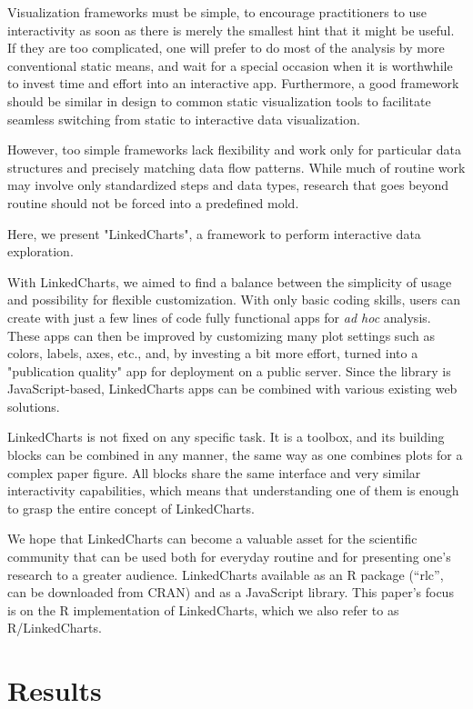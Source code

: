 \documentclass[twocolumn,10pt]{article}
\begin{document}
Visualization frameworks must be simple, to encourage practitioners to use interactivity as soon as there is merely the smallest hint that it might be useful. If they are too complicated, one will prefer to do most of the analysis by more conventional static means, and wait for a special occasion when it is worthwhile to invest time and effort into an interactive app. Furthermore, a good framework should be similar in design to common static visualization tools to facilitate seamless switching from static to interactive data visualization.

However, too simple frameworks lack flexibility and work only for particular data structures and precisely matching data flow patterns. While much of routine work may involve only standardized steps and data types, research that goes beyond routine should not be forced into a predefined mold.

Here, we present "LinkedCharts", a framework to perform interactive data exploration. 

With LinkedCharts, we aimed to find a balance between the simplicity of usage and possibility for flexible customization. With only basic coding skills, users can create with just a few lines of code fully functional apps for \emph{ad hoc} analysis. These apps can then be improved by customizing many plot settings such as colors, labels, axes, etc., and, by investing a bit more effort, turned into a "publication quality" app for deployment on a public server. Since the library is JavaScript-based, LinkedCharts apps can be combined with various existing web solutions.

LinkedCharts is not fixed on any specific task. It is a toolbox, and its building blocks can be combined in any manner, the same way as one combines plots for a complex paper figure. All blocks share the same interface and very similar interactivity capabilities, which means that understanding one of them is enough to grasp the entire concept of LinkedCharts.

We hope that LinkedCharts can become a valuable asset for the scientific community that can be used both for everyday routine and for presenting one's research to a greater audience. LinkedCharts available as an R package (``rlc'', can be downloaded from CRAN) and as a JavaScript library. This paper's focus is on the R implementation of LinkedCharts, which we also refer to as R/LinkedCharts. 

\section{Results}
\end{document}
